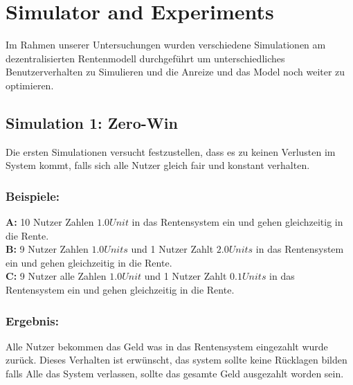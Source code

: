 \section{Simulator and Experiments}

Im Rahmen unserer Untersuchungen wurden verschiedene Simulationen am dezentralisierten Rentenmodell durchgeführt um unterschiedliches Benutzerverhalten zu Simulieren und die Anreize und das Model noch weiter zu optimieren.

\subsection{Simulation 1: Zero-Win}

Die ersten Simulationen versucht festzustellen, dass es zu keinen Verlusten im System kommt, falls sich alle Nutzer gleich fair und konstant verhalten.

\subsubsection*{Beispiele:}

\textbf{A:} 10 Nutzer Zahlen $1.0 Unit$ in das Rentensystem ein und gehen gleichzeitig in die Rente.\\
\textbf{B:} 9 Nutzer Zahlen $1.0 Units$ und 1 Nutzer Zahlt $2.0 Units$ in das Rentensystem ein und gehen gleichzeitig in die Rente.\\
\textbf{C:} 9 Nutzer alle Zahlen $1.0 Unit$ und 1 Nutzer Zahlt $0.1 Units$ in das Rentensystem ein und gehen gleichzeitig in die Rente.

\subsubsection*{Ergebnis:}

Alle Nutzer bekommen das Geld was in das Rentensystem eingezahlt wurde zurück. Dieses Verhalten ist erwünscht, das system sollte keine Rücklagen bilden falls Alle das System verlassen, sollte das gesamte Geld ausgezahlt worden sein.

